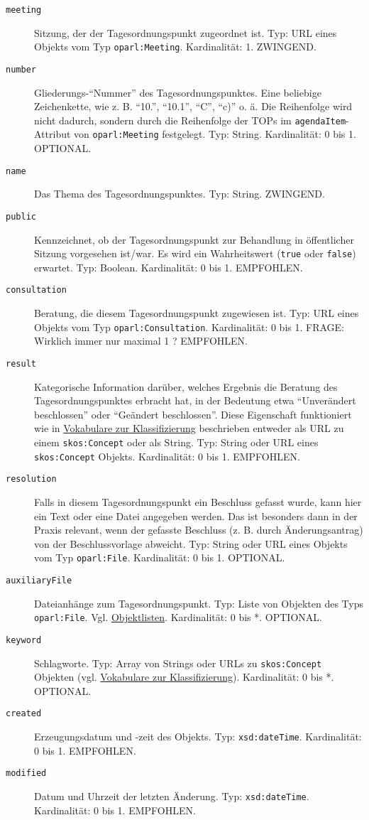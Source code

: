 \documentclass[,a4paper]{article}
\begin{document}
\begin{description}
\item[\texttt{meeting}]
Sitzung, der der Tagesordnungspunkt zugeordnet ist. Typ: URL eines
Objekts vom Typ \texttt{oparl:Meeting}. Kardinalität: 1. ZWINGEND.
\item[\texttt{number}]
Gliederungs-``Nummer'' des Tagesordnungspunktes. Eine beliebige
Zeichenkette, wie z. B. ``10.'', ``10.1'', ``C'', ``c)'' o. ä. Die
Reihenfolge wird nicht dadurch, sondern durch die Reihenfolge der TOPs
im \texttt{agendaItem}-Attribut von \texttt{oparl:Meeting} festgelegt.
Typ: String. Kardinalität: 0 bis 1. OPTIONAL.
\item[\texttt{name}]
Das Thema des Tagesordnungspunktes. Typ: String. ZWINGEND.
\item[\texttt{public}]
Kennzeichnet, ob der Tagesordnungspunkt zur Behandlung in öffentlicher
Sitzung vorgesehen ist/war. Es wird ein Wahrheitswert (\texttt{true}
oder \texttt{false}) erwartet. Typ: Boolean. Kardinalität: 0 bis 1.
EMPFOHLEN.
\item[\texttt{consultation}]
Beratung, die diesem Tagesordnungspunkt zugewiesen ist. Typ: URL eines
Objekts vom Typ \texttt{oparl:Consultation}. Kardinalität: 0 bis 1.
FRAGE: Wirklich immer nur maximal 1 ? EMPFOHLEN.
\item[\texttt{result}]
Kategorische Information darüber, welches Ergebnis die Beratung des
Tagesordnungspunktes erbracht hat, in der Bedeutung etwa ``Unverändert
beschlossen'' oder ``Geändert beschlossen''. Diese Eigenschaft
funktioniert wie in \hyperref[vokabulareux5fklassifizierung]{Vokabulare
zur Klassifizierung} beschrieben entweder als URL zu einem
\texttt{skos:Concept} oder als String. Typ: String oder URL eines
\texttt{skos:Concept} Objekts. Kardinalität: 0 bis 1. EMPFOHLEN.
\item[\texttt{resolution}]
Falls in diesem Tagesordnungspunkt ein Beschluss gefasst wurde, kann
hier ein Text oder eine Datei angegeben werden. Das ist besonders dann
in der Praxis relevant, wenn der gefasste Beschluss (z. B. durch
Änderungsantrag) von der Beschlussvorlage abweicht. Typ: String oder URL
eines Objekts vom Typ \texttt{oparl:File}. Kardinalität: 0 bis 1.
OPTIONAL.
\item[\texttt{auxiliaryFile}]
Dateianhänge zum Tagesordnungspunkt. Typ: Liste von Objekten des Typs
\texttt{oparl:File}. Vgl. \hyperref[objektlisten]{Objektlisten}.
Kardinalität: 0 bis *. OPTIONAL.
\item[\texttt{keyword}]
Schlagworte. Typ: Array von Strings oder URLs zu \texttt{skos:Concept}
Objekten (vgl. \hyperref[vokabulareux5fklassifizierung]{Vokabulare zur
Klassifizierung}). Kardinalität: 0 bis *. OPTIONAL.
\item[\texttt{created}]
Erzeugungsdatum und -zeit des Objekts. Typ: \texttt{xsd:dateTime}.
Kardinalität: 0 bis 1. EMPFOHLEN.
\item[\texttt{modified}]
Datum und Uhrzeit der letzten Änderung. Typ: \texttt{xsd:dateTime}.
Kardinalität: 0 bis 1. EMPFOHLEN.
\end{description}
\end{document}
